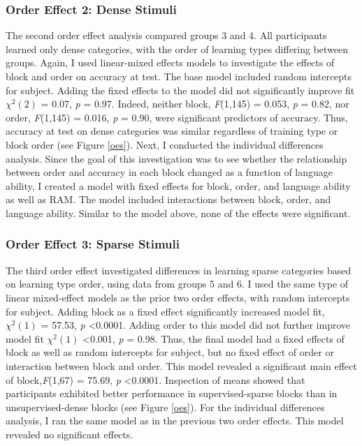 \documentclass[../dissertation.tex]{subfiles}
\begin{document}
\subsubsection{Order Effect 2: Dense Stimuli}
	The second order effect analysis compared groups 3 and 4. All participants learned only dense categories, with the order of learning types differing between groups. Again, I used linear-mixed effects models to investigate the effects of block and order on accuracy at test. The base model included random intercepts for subject. Adding the fixed effects to the model did not significantly improve fit $\chi^{2}(2)$ = 0.07,  \textit{p} = 0.97. Indeed, neither block, \textit{F}(1,145) = 0.053, \textit{p} = 0.82, nor order, \textit{F}(1,145) = 0.016, \textit{p} = 0.90, were significant predictors of accuracy. Thus, accuracy at test on dense categories was similar regardless of training type or block order (see Figure \ref{oes}).
	Next, I conducted the individual differences analysis. Since the goal of this investigation was to see whether the relationship between order and accuracy in each block changed as a function of language ability, I created a model with fixed effects for block, order, and language ability as well as RAM. The model included interactions between block, order, and language ability. Similar to the model above, none of the effects were significant.

\subsubsection{Order Effect 3: Sparse Stimuli}
	The third order effect investigated differences in learning sparse categories based on learning type order, using data from groups 5 and 6. I used the same type of linear mixed-effect models as the prior two order effects, with random intercepts for subject. Adding block as a fixed effect significantly increased model fit, $\chi^{2}(1)$ = 57.53,  \textit{p} \textless 0.0001. Adding order to this model did not further improve model fit $\chi^{2}(1)$ \textless 0.001,  \textit{p} = 0.98. Thus, the final model had a fixed effects of block as well as random intercepts for subject, but no fixed effect of order or interaction between block and order. This model revealed a significant main effect of block,\textit{F}(1,67) = 75.69, \textit{p} \textless 0.0001. Inspection of means showed that participants exhibited better performance in supervised-sparse blocks than in unsupervised-dense blocks (see Figure \ref{oes}).
	For the individual differences analysis, I ran the same model as in the previous two order effects. This model revealed no significant effects.
	
\end{document}
